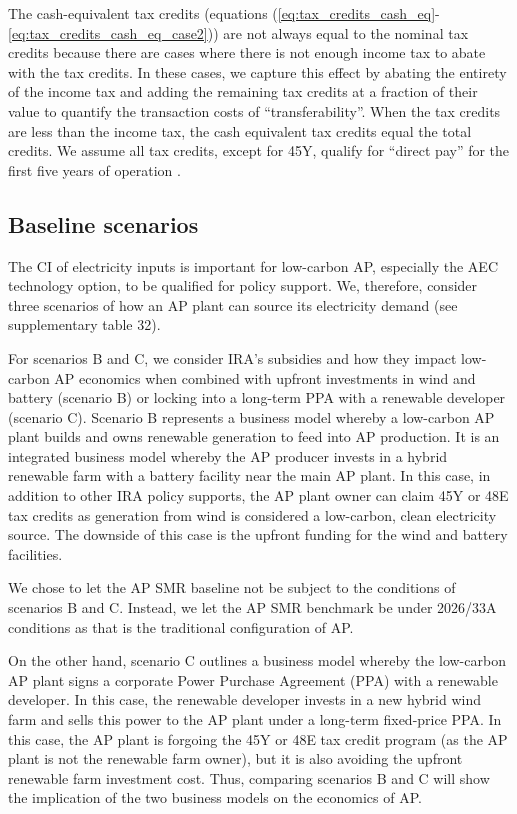\documentclass{article}
\begin{document}
The cash-equivalent tax credits (equations (\ref{eq:tax_credits_cash_eq}-\ref{eq:tax_credits_cash_eq_case2})) are not always equal to the nominal tax credits because there are cases where there is not enough income tax to abate with the tax credits. In these cases, we capture this effect by abating the entirety of the income tax and adding the remaining tax credits at a fraction of their value to quantify the transaction costs of “transferability”. When the tax credits are less than the income tax, the cash equivalent tax credits equal the total credits. We assume all tax credits, except for 45Y, qualify for “direct pay” for the first five years of operation \cite{YOSEF2023}.

\subsection*{Baseline scenarios}

The CI of electricity inputs is important for low-carbon AP, especially the AEC technology option, to be qualified for policy support. We, therefore, consider three scenarios of how an AP plant can source its electricity demand (see supplementary table 32).

For scenarios B and C, we consider IRA’s subsidies and how they impact low-carbon AP economics when combined with upfront investments in wind and battery (scenario B) or locking into a long-term PPA with a renewable developer (scenario C). Scenario B represents a business model whereby a low-carbon AP plant builds and owns renewable generation to feed into AP production. It is an integrated business model whereby the AP producer invests in a hybrid renewable farm with a battery facility near the main AP plant. In this case, in addition to other IRA policy supports, the AP plant owner can claim 45Y or 48E tax credits as generation from wind is considered a low-carbon, clean electricity source. The downside of this case is the upfront funding for the wind and battery facilities. 

We chose to let the AP SMR baseline not be subject to the conditions of scenarios B and C. Instead, we let the AP SMR benchmark be under 2026/33A conditions as that is the traditional configuration of AP.

On the other hand, scenario C outlines a business model whereby the low-carbon AP plant signs a corporate Power Purchase Agreement (PPA) with a renewable developer. In this case, the renewable developer invests in a new hybrid wind farm and sells this power to the AP plant under a long-term fixed-price PPA. In this case, the AP plant is forgoing the 45Y or 48E tax credit program (as the AP plant is not the renewable farm owner), but it is also avoiding the upfront renewable farm investment cost. Thus, comparing scenarios B and C will show the implication of the two business models on the economics of AP.
\end{document}
